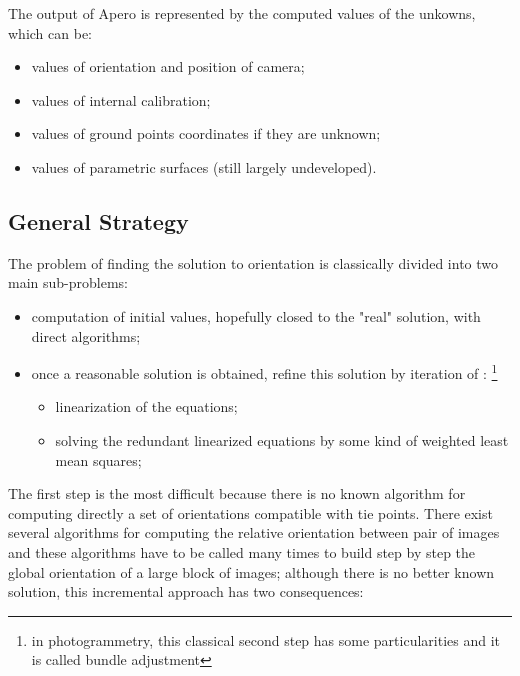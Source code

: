 The output of Apero is represented by the computed values of the unkowns,
which can be:

\begin{itemize}
    \item  values of  orientation and position of camera;

    \item  values of  internal calibration;

    \item  values of  ground points coordinates if they are unknown;

    \item  values of  parametric surfaces (still largely undeveloped).

\end{itemize}


\subsection{General Strategy}

The problem of finding the solution  to orientation is classically divided
into two main sub-problems:


\begin{itemize}
    \item  computation of initial values, hopefully closed to the "real" solution,
           with direct algorithms;
           
    \item  once a reasonable solution is obtained, refine this solution by iteration of :
            \footnote{in photogrammetry, this classical second step has some particularities and it is called bundle adjustment}


\begin{itemize}
       \item linearization of the equations;
       \item solving the redundant linearized equations by some kind of weighted least mean squares;
\end{itemize}
 
\end{itemize}

The first step is the most difficult because there is no known algorithm
for computing directly  a set of orientations compatible with tie points.
There exist several algorithms for computing the relative orientation between
pair of images and these algorithms have to be called many times to build
step by step the global orientation of a large block of images; 
although there is no better known solution,
this incremental approach has two consequences:

